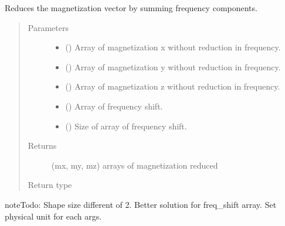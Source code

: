 \documentclass[a4paper,10pt,english]{sphinxmanual}
\begin{document}
\begin{fulllineitems}
\label{\detokenize{autodoc/mrsprint/mrsprint.simulator:mrsprint.simulator.reduce_magnetization_in_frequency}}
Reduces the magnetization vector by summing frequency components.
\begin{quote}\begin{description}
\item[{Parameters}] \leavevmode\begin{itemize}
\item {} 
 () \textendash{} Array of magnetization x without reduction in frequency.

\item {} 
 () \textendash{} Array of magnetization y without reduction in frequency.

\item {} 
 () \textendash{} Array of magnetization z without reduction in frequency.

\item {} 
 () \textendash{} Array of frequency shift.

\item {} 
 () \textendash{} Size of array of frequency shift.

\end{itemize}

\item[{Returns}] \leavevmode
(mx, my, mz) arrays of magnetization reduced

\item[{Return type}] \leavevmode
{}

\end{description}\end{quote}

\begin{sphinxadmonition}{note}{\label{autodoc/mrsprint/mrsprint.simulator:index-4}Todo:}
Shape size different of 2.
Better solution for freq\_shift array.
Set physical unit for each args.
\end{sphinxadmonition}

\end{fulllineitems}
\end{document}
